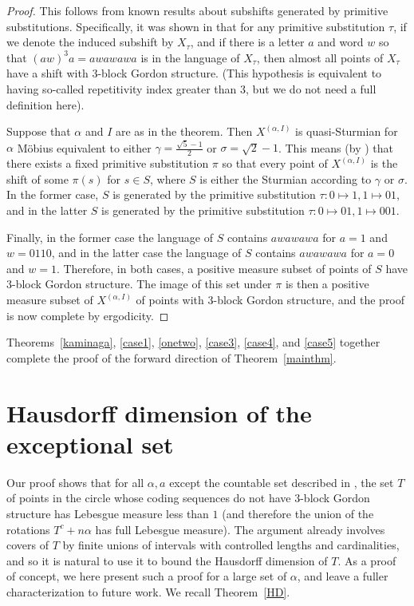 \documentclass[11pt,reqno]{amsart}
\theoremstyle{definition}
\theoremstyle{plain}
\begin{document}
\begin{proof}
This follows from known results about subshifts generated by primitive substitutions. 
Specifically, it was shown in \cite{no3block} that for any primitive substitution $\tau$, if we denote the induced subshift by $X_\tau$, and if there is a letter $a$ and word $w$ so that $(aw)^3a = awawawa$ is in the language of $X_\tau$, then almost all points of $X_\tau$ have a shift with $3$-block Gordon structure. (This hypothesis is equivalent to having so-called repetitivity index greater than $3$, but we do not need a full definition here). 

Suppose that $\alpha$ and $I$ are as in the theorem. Then $X^{(\alpha, I)}$ is quasi-Sturmian for $\alpha$ M\"{o}bius equivalent to either $\gamma = \frac{\sqrt{5}-1}{2}$ or $\sigma = \sqrt{2}-1$. This means (by \cite{quasisturm}) that there exists a fixed primitive substitution $\pi$ so that every point of $X^{(\alpha, I)}$ is the shift of some $\pi(s)$ for $s \in S$, where $S$ is either the Sturmian according to $\gamma$ or $\sigma$. In the former case, $S$ is generated by the primitive substitution $\tau: 0 \mapsto 1, 1 \mapsto 01$, and in the latter $S$ is generated by the primitive substitution $\tau: 0 \mapsto 01, 1 \mapsto 001$.

Finally, in the former case the language of $S$ contains $awawawa$ for $a = 1$ and $w = 0110$, and in the latter case the language of $S$ contains $awawawa$ for $a = 0$ and $w = 1$. Therefore, in both cases, a positive measure subset of points of $S$ have $3$-block Gordon structure. The image of this set under $\pi$ is then a positive measure subset of $X^{(\alpha,I)}$ of points with $3$-block Gordon structure, and the proof is now complete by ergodicity.

\end{proof}

Theorems~\ref{kaminaga}, \ref{case1}, \ref{onetwo}, \ref{case3}, \ref{case4}, and \ref{case5} together complete the proof of the forward direction of Theorem~\ref{mainthm}.

\section{Hausdorff dimension of the exceptional set}

Our proof shows that for all $\alpha, a$ except the countable set described in , the set $T$ of points in the circle whose coding sequences do not have $3$-block Gordon structure has Lebesgue measure less than $1$ (and therefore the union of the rotations $T^c + n\alpha$ has full Lebesgue measure). The argument already involves covers of $T$ by finite unions of intervals with controlled lengths and cardinalities, and so it is natural to use it to bound the Hausdorff dimension of $T$. As a proof of concept, we here present such a proof for a large set of $\alpha$, and leave a fuller characterization to future work. We recall Theorem~\ref{HD}.
\end{document}
